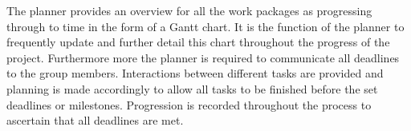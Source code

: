 The planner provides an overview for all the work packages as progressing through to time in the form of a Gantt chart. It is the function of the planner to frequently update and further detail this chart throughout the progress of the project. Furthermore more the planner is required to communicate all deadlines to the group members. Interactions between different tasks are provided and planning is made accordingly to allow all tasks to be finished before the set deadlines or milestones. Progression is recorded throughout the process to ascertain that all deadlines are met. 


